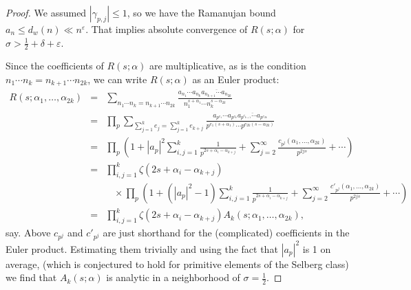 \documentclass[12pt,letterpaper]{amsart}
\theoremstyle{plain}
\theoremstyle{definition}
\theoremstyle{remark}
\numberwithin{equation}{subsection}
\numberwithin{theorem}{subsection}
\numberwithin{table}{subsection}
\begin{document}
\begin{proof}
We assumed $|\gamma_{p,j}|\le 1$, so we have the Ramanujan bound 
$a_n\le d_w(n)\ll n^\varepsilon$.  That implies absolute convergence
of $R(s;\alpha)$ for $\sigma>\frac12 +\delta+\varepsilon$.

Since the coefficients of $R(s;\alpha)$ are multiplicative, as is
the condition $n_1\cdots n_k=n_{k+1}\cdots n_{2k}$, we can write
$R(s;\alpha)$ as an Euler product:
\begin{eqnarray}
 R(s;\alpha_1,\dots,\alpha_{2k})&  = &
\sum _{  n_1\cdots n_k=n_{k+1}\cdots n_{2k} }
\frac{a_{n_1}\cdots a_{n_k}\overline{a_{n_{k+1}}\cdots a_{n_{2k}}}}
{n_1^{s+\alpha_1}\cdots n_k^{s-\alpha_{2k}}}\nonumber \\
&  = &\prod_p\sum_{  \sum_{j=1}^k e_j=\sum_{j=1}^k e_{k+j} }
\frac{a_{p^{e_1}}\cdots a_{p^{e_k}}
\overline{a_{p^{e_{k+1}}}\cdots a_{p^{e_{2k}}}}}
{p^{e_1(s+\alpha_1)}\cdots p^{e_{2k}(s-\alpha_{2k})}}\nonumber \\
&  = &\prod_p\left(1+|a_p|^2\sum_{i,j=1}^k \frac{1}{p^{2s+\alpha_i-\alpha_{k+j}}}
+\sum_{j=2}^\infty \frac{c_{p^j}(\alpha_1,\dots,\alpha_{2k})}{p^{2js}}
+\cdots\right)\nonumber \\
&  = &\prod_{i,j=1}^k\zeta(2s+\alpha_i-\alpha_{k+j}) \\
& & \phantom{X}\times
\prod_p\left(1+(|a_p|^2-1)\sum_{i,j=1}^k \frac{1}{p^{2s+\alpha_i-\alpha_{k+j}}}
+\sum_{j=2}^\infty \frac{c'_{p^j}(\alpha_1,\dots,\alpha_{2k})}{p^{2js}}
+\cdots\right)\nonumber \\
&  = &\prod_{i,j=1}^k\zeta(2s+\alpha_i-\alpha_{k+j})
A_k(s;\alpha_1,\dots,\alpha_{2k}) ,
 \end{eqnarray}
say.  Above $c_{p^j}$ and $c'_{p^j}$ are just shorthand for the (complicated)
coefficients in the Euler product. Estimating  them trivially
and using the fact that $|a_p|^2$ is 1 on average, 
(which is conjectured to hold for primitive elements of the
Selberg class)
we find that 
$A_k(s;\alpha)$ is analytic in a neighborhood of $\sigma=\frac12$.


\end{proof}
\end{document}
